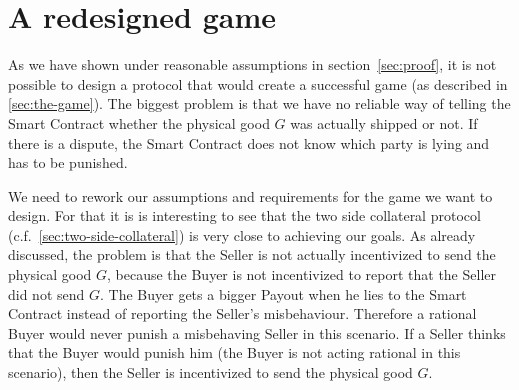 \documentclass{cacthesis}
\begin{document}
\chapter{A redesigned game}
\label{cha:redisigned-game}

As we have shown under reasonable assumptions in section~\ref{sec:proof}, it is not possible to design a protocol that would create a successful game (as described in \ref{sec:the-game}). The biggest problem is that we have no reliable way of telling the Smart Contract whether the physical good $G$ was actually shipped or not. If there is a dispute, the Smart Contract does not know which party is lying and has to be punished.\newline

We need to rework our assumptions and requirements for the game we want to design. For that it is is interesting to see that the two side collateral protocol (c.f.~\ref{sec:two-side-collateral}) is very close to achieving our goals. As already discussed, the problem is that the Seller is not actually incentivized to send the physical good $G$, because the Buyer is not incentivized to report that the Seller did not send $G$. The Buyer gets a bigger Payout when he lies to the Smart Contract instead of reporting the Seller's misbehaviour. Therefore a rational Buyer would never punish a misbehaving Seller in this scenario. If a Seller thinks that the Buyer would punish him (the Buyer is not acting rational in this scenario), then the Seller is incentivized to send the physical good $G$.\newline
\end{document}
